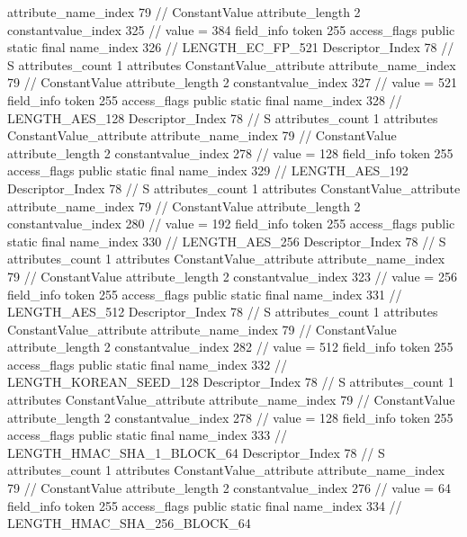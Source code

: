 {{{{{{{					attribute_name_index	79		// ConstantValue
					attribute_length	2
					constantvalue_index	325		// value = 384
				}
				}
			}
			field_info {
				token	255
				access_flags	public static final
				name_index	326		// LENGTH_EC_FP_521
				Descriptor_Index	78		// S
				attributes_count	1
				attributes {
				ConstantValue_attribute {
					attribute_name_index	79		// ConstantValue
					attribute_length	2
					constantvalue_index	327		// value = 521
				}
				}
			}
			field_info {
				token	255
				access_flags	public static final
				name_index	328		// LENGTH_AES_128
				Descriptor_Index	78		// S
				attributes_count	1
				attributes {
				ConstantValue_attribute {
					attribute_name_index	79		// ConstantValue
					attribute_length	2
					constantvalue_index	278		// value = 128
				}
				}
			}
			field_info {
				token	255
				access_flags	public static final
				name_index	329		// LENGTH_AES_192
				Descriptor_Index	78		// S
				attributes_count	1
				attributes {
				ConstantValue_attribute {
					attribute_name_index	79		// ConstantValue
					attribute_length	2
					constantvalue_index	280		// value = 192
				}
				}
			}
			field_info {
				token	255
				access_flags	public static final
				name_index	330		// LENGTH_AES_256
				Descriptor_Index	78		// S
				attributes_count	1
				attributes {
				ConstantValue_attribute {
					attribute_name_index	79		// ConstantValue
					attribute_length	2
					constantvalue_index	323		// value = 256
				}
				}
			}
			field_info {
				token	255
				access_flags	public static final
				name_index	331		// LENGTH_AES_512
				Descriptor_Index	78		// S
				attributes_count	1
				attributes {
				ConstantValue_attribute {
					attribute_name_index	79		// ConstantValue
					attribute_length	2
					constantvalue_index	282		// value = 512
				}
				}
			}
			field_info {
				token	255
				access_flags	public static final
				name_index	332		// LENGTH_KOREAN_SEED_128
				Descriptor_Index	78		// S
				attributes_count	1
				attributes {
				ConstantValue_attribute {
					attribute_name_index	79		// ConstantValue
					attribute_length	2
					constantvalue_index	278		// value = 128
				}
				}
			}
			field_info {
				token	255
				access_flags	public static final
				name_index	333		// LENGTH_HMAC_SHA_1_BLOCK_64
				Descriptor_Index	78		// S
				attributes_count	1
				attributes {
				ConstantValue_attribute {
					attribute_name_index	79		// ConstantValue
					attribute_length	2
					constantvalue_index	276		// value = 64
				}
				}
			}
			field_info {
				token	255
				access_flags	public static final
				name_index	334		// LENGTH_HMAC_SHA_256_BLOCK_64
}}}}}
